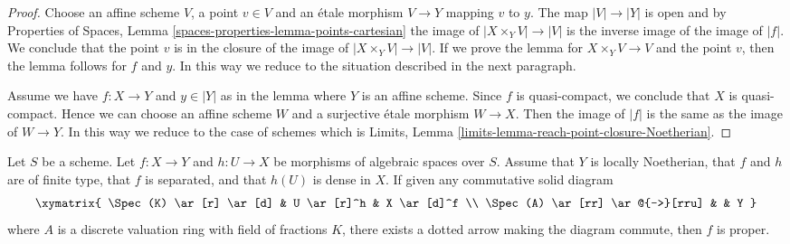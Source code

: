 \begin{proof}
Choose an affine scheme $V$, a point $v \in V$ and an \'etale morphism
$V \to Y$ mapping $v$ to $y$. The map $|V| \to |Y|$ is open and by
Properties of Spaces, Lemma \ref{spaces-properties-lemma-points-cartesian}
the image of $|X \times_Y V| \to |V|$ is the inverse image of the
image of $|f|$. We conclude that the point $v$ is in the closure of the
image of $|X \times_Y V| \to |V|$. If we prove the lemma for
$X \times_Y V \to V$ and the point $v$, then the lemma follows for
$f$ and $y$. In this way we reduce to the situation described in the
next paragraph.

\medskip\noindent
Assume we have $f : X \to Y$ and $y \in |Y|$ as in the lemma where
$Y$ is an affine scheme. Since $f$ is quasi-compact, we conclude that
$X$ is quasi-compact. Hence we can choose an affine scheme $W$ and
a surjective \'etale morphism $W \to X$. Then the image of
$|f|$ is the same as the image of $W \to Y$. In this way we reduce
to the case of schemes which is
Limits, Lemma \ref{limits-lemma-reach-point-closure-Noetherian}.
\end{proof}

\begin{lemma}
\label{lemma-refined-valuative-criterion-proper}
Let $S$ be a scheme. Let $f : X \to Y$ and $h : U \to X$ be
morphisms of algebraic spaces over $S$. Assume that $Y$ is
locally Noetherian, that $f$ and $h$ are of finite type,
that $f$ is separated, and that $h(U)$ is dense in $X$.
If given any commutative solid diagram
$$
\xymatrix{
\Spec(K) \ar[r] \ar[d] & U \ar[r]^h & X \ar[d]^f \\
\Spec(A) \ar[rr] \ar@{-->}[rru] & & Y
}
$$
where $A$ is a discrete valuation ring with field of fractions $K$, there
exists a dotted arrow making the diagram commute, then $f$ is proper.
\end{lemma}

